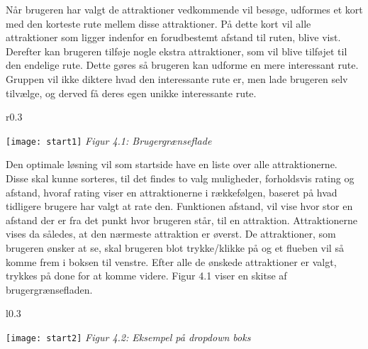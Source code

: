 Når brugeren har valgt de attraktioner vedkommende vil besøge, udformes et kort med den korteste rute mellem disse attraktioner. På dette kort vil alle attraktioner som ligger indenfor en forudbestemt afstand til ruten, blive vist. Derefter kan brugeren tilføje nogle ekstra attraktioner, som vil blive tilføjet til den endelige rute.\newline
Dette gøres så brugeren kan udforme en mere interessant rute. Gruppen vil ikke diktere hvad den interessante rute er, men lade brugeren selv tilvælge, og derved få deres egen unikke interessante rute.


\begin{wrapfigure}{r}{0.3\textwidth}
	\vspace{-20pt}
	\begin{center}
		\texttt{[image: start1]} \newline
		\textit{Figur 4.1: Brugergrænseflade}\newline
	\end{center}
	\vspace{-20pt}
	\vspace{-20pt}
\end{wrapfigure}


Den optimale løsning vil som startside have en liste over alle attraktionerne. Disse skal kunne sorteres, til det findes to valg muligheder, forholdsvis rating og afstand, hvoraf rating viser en attraktionerne i rækkefølgen, baseret på hvad tidligere brugere har valgt at rate den. Funktionen afstand, vil vise hvor stor en afstand der er fra det punkt hvor brugeren står, til en attraktion. Attraktionerne vises da således, at den nærmeste attraktion er øverst. De attraktioner, som brugeren ønsker at se, skal brugeren blot trykke/klikke på og et flueben vil så komme frem i boksen til venstre. Efter alle de ønskede attraktioner er valgt, trykkes på done for at komme videre. Figur 4.1 viser en skitse af brugergrænsefladen. \newline
\newline
\newline
\newline

\begin{wrapfigure}{l}{0.3\textwidth}
	\vspace{-40pt}
	\begin{center}
		\texttt{[image: start2]} \newline
		\textit{Figur 4.2: \newline Eksempel på dropdown boks}\newline
	\end{center}
	\vspace{20pt}
\end{wrapfigure}

